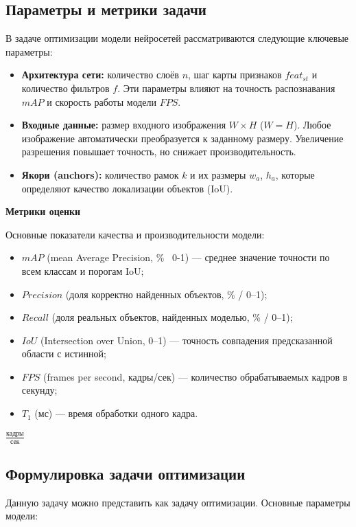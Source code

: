 \documentclass[a4paper,12pt]{article}
\begin{document}
\subsection{Параметры и метрики задачи}

В задаче оптимизации модели нейросетей рассматриваются следующие ключевые параметры:

\begin{itemize}
    \item \textbf{Архитектура сети:} количество слоёв $n$, шаг карты признаков $feat_{st}$ и количество фильтров $f$. Эти параметры влияют на точность распознавания $mAP$ и скорость работы модели $FPS$.
    \item \textbf{Входные данные:} размер входного изображения $W \times H$ ($W = H$). Любое изображение автоматически преобразуется к заданному размеру. Увеличение разрешения повышает точность, но снижает производительность.
    \item \textbf{Якори (anchors):} количество рамок $k$ и их размеры $w_a$, $h_a$, которые определяют качество локализации объектов (IoU).
\end{itemize}

\textbf{Метрики оценки}

Основные показатели качества и производительности модели:  

\begin{itemize}
    \item $mAP$ (mean Average Precision, \% \ 0-1) — среднее значение точности по всем классам и порогам IoU;
    \item $Precision$ (доля корректно найденных объектов, \% / 0–1);
    \item $Recall$ (доля реальных объектов, найденных моделью, \% / 0–1);
    \item $IoU$ (Intersection over Union, 0–1) — точность совпадения предсказанной области с истинной;
    \item $FPS$ (frames per second, кадры/сек) — количество обрабатываемых кадров в секунду;
    \item $T_1$ (мс) — время обработки одного кадра.
\end{itemize}

\(\frac{кадры}{сек}\)

\subsection{Формулировка задачи оптимизации}

Данную задачу можно представить как задачу оптимизации. Основные параметры модели:
\end{document}
